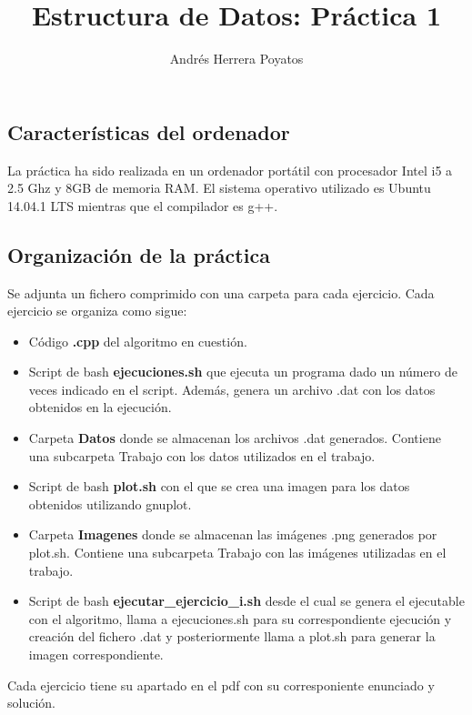 \documentclass[]{article}
\title{Estructura de Datos: Práctica 1}
\author{Andrés Herrera Poyatos}
\date{}
\begin{document}
\maketitle


\subsection{Características del
ordenador}\label{caracteristicas-del-ordenador}

La práctica ha sido realizada en un ordenador portátil con procesador
Intel i5 a 2.5 Ghz y 8GB de memoria RAM. El sistema operativo utilizado
es Ubuntu 14.04.1 LTS mientras que el compilador es g++.

\subsection{Organización de la
práctica}\label{organizacion-de-la-practica}

Se adjunta un fichero comprimido con una carpeta para cada ejercicio.
Cada ejercicio se organiza como sigue:

\begin{itemize}
\itemsep1pt\parskip0pt
\item
  Código \textbf{.cpp} del algoritmo en cuestión.
\item
  Script de bash \textbf{ejecuciones.sh} que ejecuta un programa dado un
  número de veces indicado en el script. Además, genera un archivo .dat
  con los datos obtenidos en la ejecución.
\item
  Carpeta \textbf{Datos} donde se almacenan los archivos .dat generados.
  Contiene una subcarpeta Trabajo con los datos utilizados en el
  trabajo.
\item
  Script de bash \textbf{plot.sh} con el que se crea una imagen para los
  datos obtenidos utilizando gnuplot.
\item
  Carpeta \textbf{Imagenes} donde se almacenan las imágenes .png
  generados por plot.sh. Contiene una subcarpeta Trabajo con las
  imágenes utilizadas en el trabajo.
\item
  Script de bash \textbf{ejecutar\_ejercicio\_i.sh} desde el cual se
  genera el ejecutable con el algoritmo, llama a ejecuciones.sh para su
  correspondiente ejecución y creación del fichero .dat y posteriormente
  llama a plot.sh para generar la imagen correspondiente.
\end{itemize}

Cada ejercicio tiene su apartado en el pdf con su corresponiente
enunciado y solución.
\end{document}
